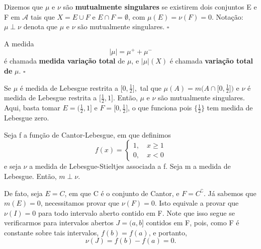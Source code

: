 \documentclass[MeasureTheory/measure_theory.tex]{subfiles}
\begin{document}
\begin{def*}
	Dizemos que \(\mu \) e \(\nu\) são \textbf{mutualmente singulares} se existirem dois conjuntos E e F em \(\mathcal{A}\) tais que \(X = E\cup F\) e \(E\cap F = \emptyset \), com \(\mu (E) = \nu(F) = 0.\) Notação: \(\mu \perp \nu\) denota que \(\mu \) e \(\nu\) são mutualmente singulares. \(\square\)
\end{def*}
\begin{def*}
	A medida
	\[
		|\mu | = \mu ^{+} + \mu ^{-}
	\]
	é chamada \textbf{medida variação total} de \(\mu \), e \(|\mu |(X)\) é chamada \textbf{variação total de }\(\mu \). \(\square\)
\end{def*}
\begin{example}
	Se \(\mu \) é medida de Lebesgue restrita a \(\biggl[0, \frac{1}{2}\biggr],\) tal que \(\mu (A) = m \biggl(A \cap \biggl[0, \frac{1}{2}\biggr]\biggr) \) e \(\nu\) é medida de Lebesgue restrita a \(\biggl[\frac{1}{2}, 1\biggr].\) Então, \(\mu \) e \(\nu\) são mutualmente singulares. Aqui, basta tomar \(E = \biggl(\frac{1}{2}, 1\biggr]\) e \(F = \biggl[0, \frac{1}{2}\biggr]\), o que funciona pois
	\(\biggl\{\frac{1}{2}\biggr\}\) tem medida de Lebesgue zero.
\end{example}
\begin{example}
	Seja f a função de Cantor-Lebesgue, em que definimos
	\[
		f(x) = \left\{\begin{array}{ll}
			1,\quad x\geq 1 \\
			0,\quad x < 0
		\end{array}\right.
	\]
	e seja \(\nu\) a medida de Lebesgue-Stieltjes associada a f. Seja m a medida de Lebesgue. Então, \(m\perp \nu\).

	De fato, seja \(E = C\), em que C é o conjunto de Cantor, e \(F= C ^{\complement}.\) Já sabemos que \(m(E) = 0\), necessitamos provar que
	\(\nu(F) = 0.\) Isto equivale a provar que \(\nu(I) = 0\) para todo intervalo aberto contido em F. Note que isso segue se verificarmos para intervalos abertos \(J = (a, b]\) contidos em F, pois, como
	F é constante sobre tais intervalos, \(f(b) = f(a)\), e portanto,
	\[
		\nu(J) = f(b)-f(a) = 0.
	\]
\end{example}
\end{document}
